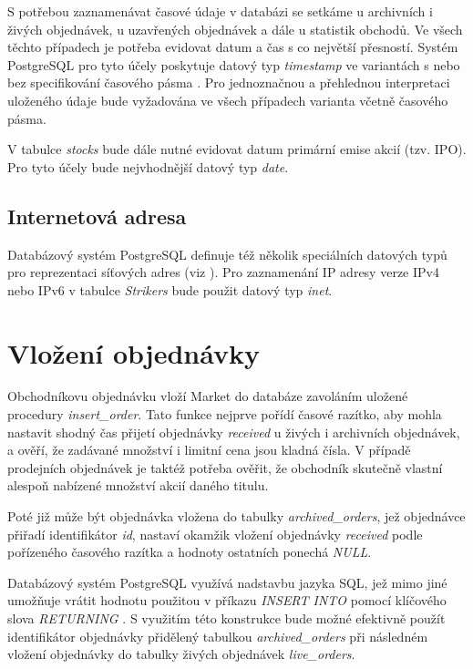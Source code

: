 \documentclass[thesis=M,czech]{FITthesis}[2012/06/26]
\begin{document}
S potřebou zaznamenávat časové údaje v databázi se setkáme u archivních i živých objednávek, u uzavřených objednávek a dále
u statistik obchodů. Ve všech těchto případech je potřeba evidovat datum a čas s co největší přesností. Systém PostgreSQL pro tyto 
účely poskytuje datový typ \textit{timestamp} ve variantách s nebo bez specifikování časového pásma \cite{pgdoc}. Pro jednoznačnou a přehlednou 
interpretaci uloženého údaje bude vyžadována ve všech případech varianta včetně časového pásma.

V tabulce \textit{stocks} bude dále nutné evidovat datum primární emise akcií (tzv. IPO). Pro tyto účely bude nejvhodnější datový typ
\textit{date}.


\subsection{Internetová adresa}

Databázový systém PostgreSQL definuje též několik speciálních datových typů pro reprezentaci síťových adres (viz \cite{pgdoc}). 
Pro zaznamenání IP adresy verze IPv4 nebo IPv6 v tabulce \textit{Strikers} bude použit datový typ \textit{inet}.


\section{Vložení objednávky}

Obchodníkovu objednávku vloží Market do databáze zavoláním uložené procedury \textit{insert\_order}. Tato funkce nejprve 
pořídí časové razítko, aby mohla nastavit shodný čas přijetí objednávky \textit{received} u živých i archivních objednávek, a ověří, 
že zadávané množství i limitní cena jsou kladná čísla. V případě prodejních objednávek je taktéž potřeba ověřit, že obchodník skutečně 
vlastní alespoň nabízené množství akcií daného titulu.

Poté již může být objednávka vložena do tabulky \textit{archived\_orders}, jež objednávce přiřadí identifikátor \textit{id}, nastaví 
okamžik vložení objednávky \textit{received} podle pořízeného časového razítka a hodnoty ostatních  ponechá 
\textit{NULL}. 

Databázový systém PostgreSQL využívá nadstavbu jazyka SQL, jež mimo jiné umožňuje vrátit hodnotu použitou v příkazu \textit{INSERT INTO} 
pomocí klíčového slova \textit{RETURNING} \cite{pgdoc}. S využitím této konstrukce bude možné efektivně použít identifikátor objednávky 
přidělený tabulkou \textit{archived\_orders} při následném vložení objednávky do tabulky živých objednávek \textit{live\_orders}.
\end{document}
